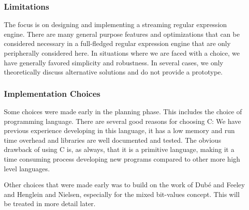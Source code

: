 \subsubsection{Limitations}

The focus is on designing and implementing a streaming regular
expression engine. There are many general purpose features and
optimizations that can be considered necessary in a full-fledged
regular expression engine that are only peripherally considered
here. In situations where we are faced with a choice, we have
generally favored simplicity and robustness.  In several cases, we
only theoretically discuss alternative solutions and do not provide a
prototype.%

\subsubsection{Implementation Choices}

Some choices were made early in the planning phase. This includes the
choice of programming language. There are several good reasons for
choosing C: We have previous experience developing in this language,
it has a low memory and run time overhead and libraries are well
documented and tested. The obvious drawback of using C is, as always,
that it is a primitive language, making it a time consuming process
developing new programs compared to other more high level languages.


Other choices that were made early was to build on the work of
Dub\'{e} and Feeley and Henglein and Nielsen, especially for the mixed
bit-values concept. This will be treated in more detail later.

